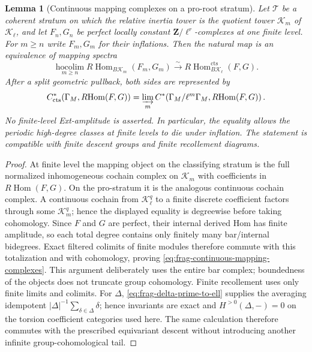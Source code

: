\documentclass[11pt]{article}
\newtheorem{lemma}[theorem]{Lemma}
\theoremstyle{definition}
\theoremstyle{remark}
\begin{document}
\begin{lemma}[Continuous mapping complexes on a pro-root stratum]
\label{lem:frag-continuous-mapping-complexes}
Let $\mathscr T$ be a coherent stratum on which the relative inertia tower is
the quotient tower $\mathcal K_m$ of $\mathcal K_\ell$, and let $F_n,G_n$ be
perfect locally constant $\mathbf Z/\ell^r$-complexes at one finite level.  For
$m\ge n$ write $F_m,G_m$ for their inflations.  Then the natural map is an
equivalence of mapping spectra
\begin{equation}
 \operatorname*{hocolim}_{m\ge n}
 R\!\operatorname{Hom}_{B\mathcal K_m}(F_m,G_m)
 \xrightarrow{\sim}
 R\!\operatorname{Hom}_{B\mathcal K_\ell}^{\mathrm{cts}}(F,G).
 \label{eq:frag-continuous-mapping-complexes}
\end{equation}
After a split geometric pullback, both sides are represented by
\[
 C^*_{\mathrm{cts}}\!\left(
   \Gamma_M,R\!\operatorname{Hom}(F,G)\right)
 =\varinjlim_m
 C^*\!\left(\Gamma_M/\ell^m\Gamma_M,
             R\!\operatorname{Hom}(F,G)\right).
\]
No finite-level Ext-amplitude is asserted.  In particular, the equality allows
the periodic high-degree classes at finite levels to die under inflation.  The
statement is compatible with finite descent groups and finite recollement
diagrams.
\end{lemma}

\begin{proof}
At finite level the mapping object on the classifying stratum is the full
normalized inhomogeneous cochain complex on $\mathcal K_m$ with coefficients
in $R\!\operatorname{Hom}(F,G)$.  On the pro-stratum it is the analogous
continuous cochain complex.  A continuous cochain from
$\mathcal K_\ell^q$ to a finite discrete coefficient factors through some
$\mathcal K_m^q$; hence the displayed equality is degreewise before taking
cohomology.  Since $F$ and $G$ are perfect, their internal derived Hom has
finite amplitude, so each total degree contains only finitely many
bar/internal bidegrees.  Exact filtered colimits of finite modules therefore
commute with this totalization and with cohomology, proving
\eqref{eq:frag-continuous-mapping-complexes}.  This argument deliberately uses
the entire bar complex; boundedness of the objects does not truncate group
cohomology.  Finite recollement uses only finite limits and colimits.  For
$\Delta$, \eqref{eq:frag-delta-prime-to-ell} supplies the averaging idempotent
$|\Delta|^{-1}\sum_{\delta\in\Delta}\delta$; hence invariants are exact and
$H^{>0}(\Delta,-)=0$ on the torsion coefficient categories used here.  The
same calculation therefore commutes with the prescribed equivariant descent
without introducing another infinite group-cohomological tail.
\end{proof}
\end{document}
